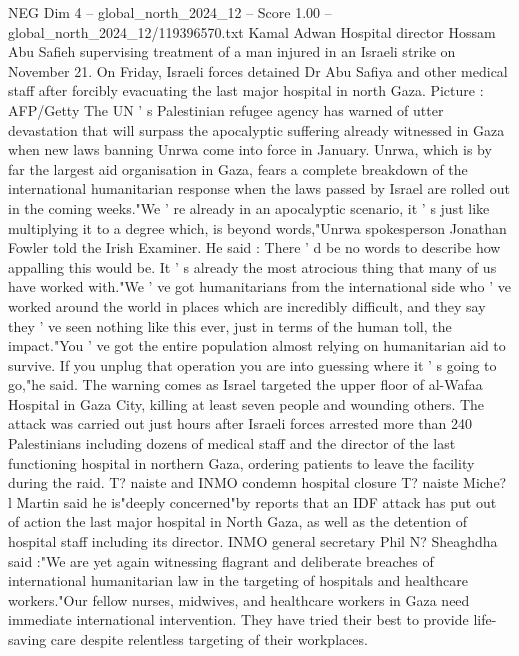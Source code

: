 \begin{textsample}{NEG Dim 4 – global\_north\_2024\_12 – Score 1.00 – global\_north\_2024\_12/119396570.txt}  \label{ex:f4_neg_154}
Kamal Adwan Hospital director Hossam Abu Safieh supervising treatment of a man injured in an Israeli strike on November 21.
On Friday, Israeli forces detained Dr Abu Safiya and other medical staff after forcibly evacuating the last major hospital in north Gaza.
Picture : AFP/Getty The UN ' s Palestinian refugee agency has warned of utter devastation that will surpass the apocalyptic suffering already witnessed in Gaza when new laws banning Unrwa come into force in January.
Unrwa, which is by far the largest aid organisation in Gaza, fears a complete breakdown of the international humanitarian response when the laws passed by Israel are rolled out in the coming weeks."We ' re already in an apocalyptic scenario, it ' s just like multiplying it to a degree which, is beyond words,"Unrwa spokesperson Jonathan Fowler told the Irish Examiner.
He said : There ' d be no words to describe how appalling this would be.
It ' s already the most atrocious thing that many of us have worked with."We ' ve got humanitarians from the international side who ' ve worked around the world in places which are incredibly difficult, and they say they ' ve seen nothing like this ever, just in terms of the human toll, the impact."You ' ve got the entire population almost relying on humanitarian aid to survive.
If you unplug that operation you are into guessing where it ' s going to go,"he said.
The warning comes as Israel targeted the upper floor of al-Wafaa Hospital in Gaza City, killing at least seven people and wounding others.
The attack was carried out just hours after Israeli forces arrested more than 240 Palestinians including dozens of medical staff and the director of the last functioning hospital in northern Gaza, ordering patients to leave the facility during the raid.
T? naiste and INMO condemn hospital closure T? naiste Miche? l Martin said he is"deeply concerned"by reports that an IDF attack has put out of action the last major hospital in North Gaza, as well as the detention of hospital staff including its director.
INMO general secretary Phil N?
Sheaghdha said :"We are yet again witnessing flagrant and deliberate breaches of international humanitarian law in the targeting of hospitals and healthcare workers."Our fellow nurses, midwives, and healthcare workers in Gaza need immediate international intervention.
They have tried their best to provide life-saving care despite relentless targeting of their workplaces.

\end{textsample}
